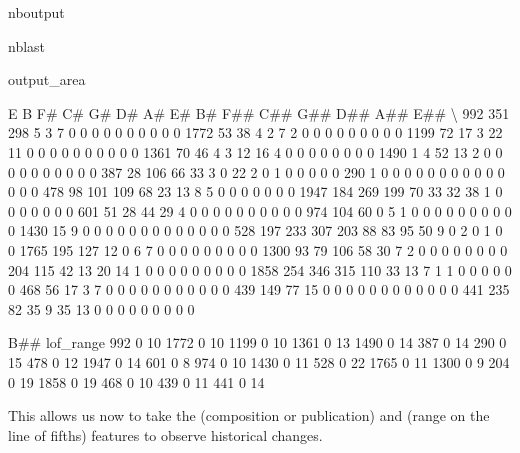 \documentclass[letterpaper,10pt,english]{sphinxmanual}
\begin{document}
\begin{sphinxuseclass}{nboutput}
\begin{sphinxuseclass}{nblast}
{\begin{sphinxuseclass}{output_area}
\begin{sphinxuseclass}{}
\begin{sphinxVerbatim}[commandchars=\\\{\}]
        E    B   F\#   C\#  G\#  D\#  A\#  E\#  B\#  F\#\#  C\#\#  G\#\#  D\#\#  A\#\#  E\#\#  \textbackslash{}
992   351  298    5    3   7   0   0   0   0    0    0    0    0    0    0
1772   53   38    4    2   7   2   0   0   0    0    0    0    0    0    0
1199   72   17    3   22  11   0   0   0   0    0    0    0    0    0    0
1361   70   46    4    3  12  16   4   0   0    0    0    0    0    0    0
1490    1    4   52   13   2   0   0   0   0    0    0    0    0    0    0
387    28  106   66   33   3   0  22   2   0    1    0    0    0    0    0
290     1    0    0    0   0   0   0   0   0    0    0    0    0    0    0
478    98  101  109   68  23  13   8   5   0    0    0    0    0    0    0
1947  184  269  199   70  33  32  38   1   0    0    0    0    0    0    0
601    51   28   44   29   4   0   0   0   0    0    0    0    0    0    0
974   104   60    0    5   1   0   0   0   0    0    0    0    0    0    0
1430   15    9    0    0   0   0   0   0   0    0    0    0    0    0    0
528   197  233  307  203  88  83  95  50   9    0    2    0    1    0    0
1765  195  127   12    0   6   7   0   0   0    0    0    0    0    0    0
1300   93   79  106   58  30   7   2   0   0    0    0    0    0    0    0
204   115   42   13   20  14   1   0   0   0    0    0    0    0    0    0
1858  254  346  315  110  33  13   7   1   1    0    0    0    0    0    0
468    56   17    3    7   0   0   0   0   0    0    0    0    0    0    0
439   149   77   15    0   0   0   0   0   0    0    0    0    0    0    0
441   235   82   35    9  35  13   0   0   0    0    0    0    0    0    0

      B\#\#  lof\_range
992     0         10
1772    0         10
1199    0         10
1361    0         13
1490    0         14
387     0         14
290     0         15
478     0         12
1947    0         14
601     0          8
974     0         10
1430    0         11
528     0         22
1765    0         11
1300    0          9
204     0         19
1858    0         19
468     0         10
439     0         11
441     0         14
\end{sphinxVerbatim}



\end{sphinxuseclass}
\end{sphinxuseclass}
}

\end{sphinxuseclass}
\end{sphinxuseclass}
\sphinxAtStartPar
This allows us now to take the  (composition or publication) and  (range on the line of fifths) features to observe historical changes.
\end{document}
